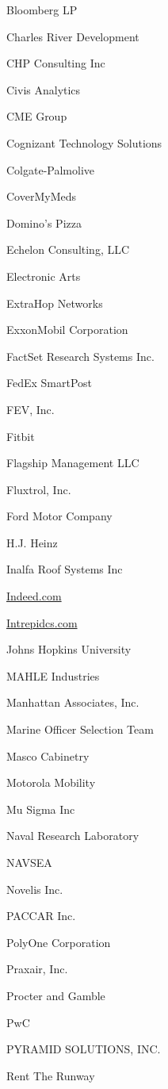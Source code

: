 \documentclass[twoside]{article}
\begin{document}
\begin{center}
\begin{multicols}{5}
\begin{FlushLeft}
\begin{compactitem}
\item Bloomberg LP
\item Charles River Development
\item CHP Consulting Inc
\item Civis Analytics
\item CME Group
\item Cognizant Technology Solutions
\item Colgate-Palmolive
\item CoverMyMeds
\item Domino's Pizza
\item Echelon Consulting, LLC
\item Electronic Arts
\item ExtraHop Networks
\item ExxonMobil Corporation
\item FactSet Research Systems Inc.
\item FedEx SmartPost
\item FEV, Inc.
\item Fitbit
\item Flagship Management LLC
\item Fluxtrol, Inc.
\item Ford Motor Company
\item H.J. Heinz
\item Inalfa Roof Systems Inc
\item \url{Indeed.com}
\item \url{Intrepidcs.com}
\item Johns Hopkins University
\item MAHLE Industries
\item Manhattan Associates, Inc.
\item Marine Officer Selection Team
\item Masco Cabinetry
\item Motorola Mobility
\item Mu Sigma Inc
\item Naval Research Laboratory
\item NAVSEA
\item Novelis Inc.
\item PACCAR Inc.
\item PolyOne Corporation
\item Praxair, Inc.
\item Procter and Gamble
\item PwC
\item PYRAMID SOLUTIONS, INC.
\item Rent The Runway

\end{compactitem}
\end{FlushLeft}
\end{multicols}
\end{center}
\end{document}
